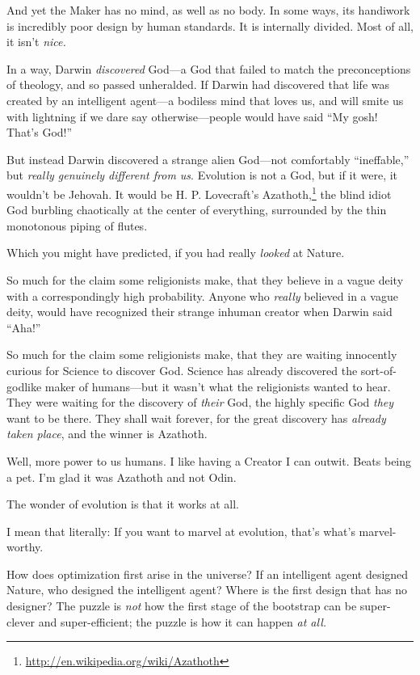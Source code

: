  And yet the Maker has no mind, as well as no body. In some ways,
its handiwork is incredibly poor design by human standards. It is
internally divided. Most of all, it isn't
\textit{nice.}


 In a way, Darwin \textit{discovered} God---a God that failed to
match the preconceptions of theology, and so passed unheralded. If
Darwin had discovered that life was created by an intelligent agent---a
bodiless mind that loves us, and will smite us with lightning if we
dare say otherwise---people would have said ``My gosh!
That's God!''


 But instead Darwin discovered a strange alien God---not
comfortably ``ineffable,'' but
\textit{really genuinely different from us}. Evolution is not a God,
but if it were, it wouldn't be Jehovah. It would be H.
P. Lovecraft's Azathoth,\footnote{\url{http://en.wikipedia.org/wiki/Azathoth}} the blind idiot God burbling
chaotically at the center of everything, surrounded by the thin
monotonous piping of flutes.


 Which you might have predicted, if you had really \textit{looked}
at Nature.


 So much for the claim some religionists make, that they believe in
a vague deity with a correspondingly high probability. Anyone who
\textit{really} believed in a vague deity, would have recognized their
strange inhuman creator when Darwin said
``Aha!''


 So much for the claim some religionists make, that they are
waiting innocently curious for Science to discover God. Science has
already discovered the sort-of-godlike maker of humans---but it
wasn't what the religionists wanted to hear. They were
waiting for the discovery of \textit{their} God, the highly specific
God \textit{they} want to be there. They shall wait forever, for the
great discovery has \textit{already taken place}, and the winner is
Azathoth.


 Well, more power to us humans. I like having a Creator I can
outwit. Beats being a pet. I'm glad it was Azathoth and
not Odin.

\myendsectiontext


\bigskip



 The wonder of evolution is that it works at all. 


 I mean that literally: If you want to marvel at evolution,
that's what's marvel-worthy.


 How does optimization first arise in the universe? If an
intelligent agent designed Nature, who designed the intelligent agent?
Where is the first design that has no designer? The puzzle is
\textit{not} how the first stage of the bootstrap can be super-clever
and super-efficient; the puzzle is how it can happen \textit{at all.}


